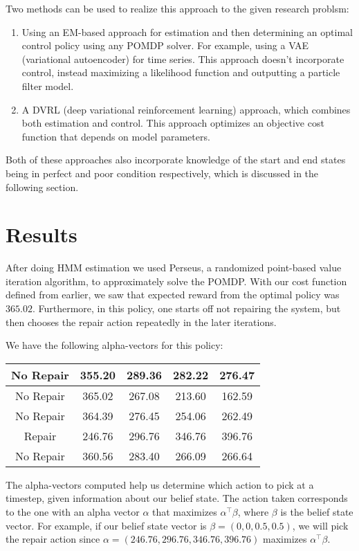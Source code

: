 \documentclass[english]{article}
\numberwithin{equation}{section}
\begin{document}
	Two methods can be used to realize this approach to the given research problsm:
	\begin{enumerate}
		\item Using an EM-based approach for estimation and then determining an optimal control policy using any POMDP solver. For example, using a VAE (variational autoencoder) for time series. This approach doesn't incorporate control, instead maximizing a likelihood function and outputting a particle filter model.
		\item A DVRL (deep variational reinforcement learning) approach, which combines both estimation and control. This approach optimizes an objective cost function that depends on model parameters.
	\end{enumerate}
	
	Both of these approaches also incorporate knowledge of the start and end states being in perfect and poor condition respectively, which is discussed in the following section.
	
	\section*{Results}
After doing HMM estimation we used Perseus, a randomized point-based value iteration algorithm, to approximately solve the POMDP. With our cost function defined from earlier, we saw that expected reward from the optimal policy was $365.02$. Furthermore, in this policy, one starts off not repairing the system, but then chooses the repair action repeatedly in the later iterations.

We have the following alpha-vectors for this policy:

\begin{tabular}{|c|c|c|c|c|}
	\hline 
	No Repair & 355.20 & 289.36 & 282.22 & 276.47 \\ 
	\hline 
	No Repair & 365.02 & 267.08 & 213.60 & 162.59 \\ 
	\hline 
	No Repair & 364.39 & 276.45 & 254.06 & 262.49 \\ 
	\hline 
	Repair & 246.76 & 296.76 & 346.76 & 396.76 \\ 
	\hline 
	No Repair & 360.56 & 283.40 & 266.09 & 266.64 \\ 
	\hline 
\end{tabular} 

The alpha-vectors computed help us determine which action to pick at a timestep, given information about our belief state. The action taken corresponds to the one with an alpha vector $\alpha$ that maximizes $\alpha^{\top} \beta$, where $\beta$ is the belief state vector. For example, if our belief state vector is $\beta=(0,0,0.5,0.5)$, we will pick the repair action since $\alpha=(246.76,296.76,346.76,396.76)$ maximizes $\alpha^{\top} \beta$.  
\end{document}
